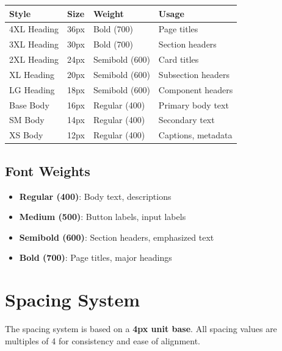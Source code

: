 \documentclass{report}
\begin{document}
\begin{table}[h]
\centering
\begin{tabular}{|l|l|l|l|}
\hline
\textbf{Style} & \textbf{Size} & \textbf{Weight} & \textbf{Usage} \\
\hline
4XL Heading & 36px & Bold (700) & Page titles \\
\hline
3XL Heading & 30px & Bold (700) & Section headers \\
\hline
2XL Heading & 24px & Semibold (600) & Card titles \\
\hline
XL Heading & 20px & Semibold (600) & Subsection headers \\
\hline
LG Heading & 18px & Semibold (600) & Component headers \\
\hline
Base Body & 16px & Regular (400) & Primary body text \\
\hline
SM Body & 14px & Regular (400) & Secondary text \\
\hline
XS Body & 12px & Regular (400) & Captions, metadata \\
\hline
\end{tabular}
\end{table}

\subsection{Font Weights}
\begin{itemize}
    \item \textbf{Regular (400)}: Body text, descriptions
    \item \textbf{Medium (500)}: Button labels, input labels
    \item \textbf{Semibold (600)}: Section headers, emphasized text
    \item \textbf{Bold (700)}: Page titles, major headings
\end{itemize}

\section{Spacing System}

The spacing system is based on a \textbf{4px unit base}. All spacing values are multiples of 4 for consistency and ease of alignment.
\end{document}
